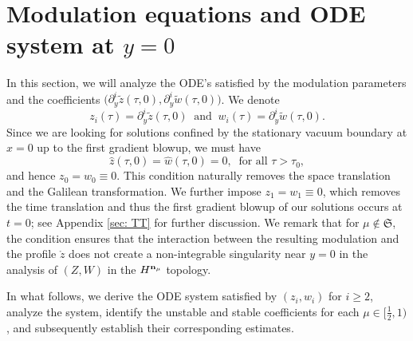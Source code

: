 \documentclass{article}
\newcommand{\pa}{\partial}
\def\be{\begin{equation}}
\def\ee{\end{equation}}
\def\ssmu{\mathfrak S}
\def\ndmu{{\bf{n}_{\mu}}}
\numberwithin{equation}{section}
\begin{document}
\section{Modulation equations and ODE system at $y=0$}\label{section 3}




In this section, we will analyze the ODE's satisfied by the modulation parameters and the coefficients $\big(\pa_y^i\tilde z(\tau,0),\pa_y^i\tilde w(\tau,0)\big)$. We denote 
\be\label{notation ziwi}
	z_i(\tau) = \pa_y^i \tilde z (\tau,0) \ \text{ and } \ w_i(\tau) = \pa_y^i \tilde w (\tau,0).
\ee
Since we are looking for solutions confined by the stationary vacuum boundary at $x=0$ up to the first gradient blowup, we must have 
\be\label{zero BC}
    \hat z(\tau,0) = \hat w (\tau,0) = 0,\ \text{ for all }\tau>\tau_0, 
\ee 
and hence $z_0=w_0\equiv 0$. 
This condition naturally removes the space translation and the Galilean transformation. We further impose $z_1 = w_1 \equiv 0$, which removes the time translation and thus the first gradient blowup of our solutions occurs at $t=0$; see Appendix \ref{sec: TT} for further discussion.  We remark that for $\mu\notin\ssmu$, the condition ensures that the interaction between the resulting modulation and the profile $\mathring z$ does not create a non-integrable singularity near $y=0$ in the analysis of $(Z,W)$ in the $H^\ndmu$ topology.   


In what follows, we derive the ODE system satisfied by $(z_i,w_i)$ for $i\ge 2$, analyze the system, identify the unstable and stable coefficients for each $\mu\in[\frac{1}{2},1)$, and subsequently establish their corresponding estimates. 
\end{document}
